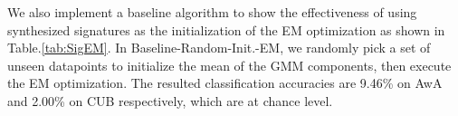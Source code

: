 \documentclass{article}
\begin{document}
We also implement a baseline algorithm to show the effectiveness of using synthesized signatures as the initialization of the EM optimization as shown in Table.\ref{tab:SigEM}. In Baseline-Random-Init.-EM, we randomly pick a set of unseen datapoints to initialize the mean of the GMM components, then execute the EM optimization. The resulted classification accuracies are 9.46\% on AwA and 2.00\% on CUB respectively, which are at chance level.

\end{document}
